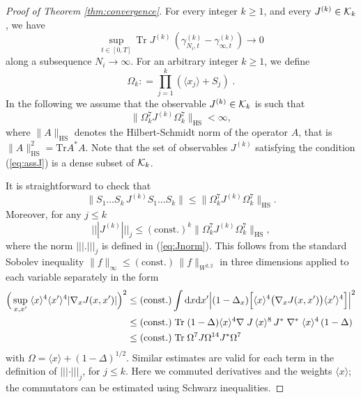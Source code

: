 \documentclass[11pt]{article}
\newcommand{\tri}{| \! | \! |}
\newcommand{\rd}{{\rm d}}
\newcommand{\be}{\begin{equation}}
\newcommand{\ee}{\end{equation}}
\newcommand{\la}{\langle}
\newcommand{\ra}{\rangle}
\newcommand{\tr}{\mbox{Tr}}
\newcommand{\const}{\mathrm{const}}
\newcommand{\cK}{{\cal K}}
\begin{document}
\begin{proof}[Proof of Theorem \ref{thm:convergence}]
For every integer $k
\geq 1$, and every $J^{(k)} \in \cK_k$, we have
\begin{equation}\label{eq:conv-0}
\sup_{t \in [0,T]} \, \tr \; J^{(k)} \, \left( \gamma_{N_i,t}^{(k)} -
 \gamma_{\infty,t}^{(k)} \right) \to 0
\end{equation}
along a subsequence $N_i\to \infty$.
 For an arbitrary integer $k \geq 1$, we define
$$
   \Omega_k : =  \prod_{j=1}^k \left( \la
x_j \ra + S_j \right)   \; .
$$
In the following we assume that the observable $J^{(k)} \in \cK_k$
is such that
\begin{equation}\label{eq:assJ} \Big\| \Omega_k^7
 J^{(k)}\Omega_k^7 \Big\|_{\text{HS}} < \infty ,
\end{equation}
where  $\| A \|_{\text{HS}}$ denotes the Hilbert-Schmidt norm of the
operator $A$, that is $\| A \|^2_{\text{HS}} = \tr A^* A$.
 Note that the set of observables $J^{(k)}$
satisfying the condition (\ref{eq:assJ}) is a dense subset of
$\cK_k$.

It is straightforward to check that
\begin{equation}\label{eq:assJsimple}
\| S_1 \dots S_k \, J^{(k)} S_1 \dots S_k \| \leq \Big\| \Omega_k^7
 J^{(k)}\Omega_k^7 \Big\|_{\text{HS}} .
\end{equation}
Moreover,  for any $j\leq k$ \be \label{HStoj} \tri J^{(k)}\tri_j
\leq (\mbox{const.})^k \Big\| \Omega_k^7 J^{(k)}\Omega_k^7
\Big\|_{\text{HS}} , \ee
where the norm $\tri . \tri_j$ is defined
in (\ref{eq:Jnorm}). This follows from the standard Sobolev
inequality $\| f\|_\infty \leq (\const.) \,  \| f \|_{W^{2,2}}$ in three
dimensions applied to each variable separately in the form
\begin{equation*}
\begin{split}
\Big(\sup_{x,x'} \; \langle x \rangle^4 \langle x'\rangle^4
|\nabla_x J(x,x')|\Big)^2 &\leq (\const.) \int \rd x \rd x' \Big|
  (1-\Delta_x) \Big[\langle x \rangle^4
 \big(\nabla_x J(x,x') \big)\langle x'\rangle^4\Big]\Big|^2
\\ &\leq (\const.) \; \tr \; (1-\Delta)  \langle x \rangle^4 \nabla \; J
 \, \langle x \rangle^8 \, J^* \;  \nabla^*  \;
 \langle x \rangle^4 \, (1-\Delta)
\\& \leq (\const.) \; \tr \; \Omega^7 J\Omega^{14} J^* \Omega^7
\end{split}
\end{equation*}
with $\Omega = \langle x \rangle + (1-\Delta)^{1/2}$. Similar
estimates are valid for each term in the definition of $\tri \cdot
\tri_j$, for $j \leq k$. Here we  commuted derivatives and the
weights $\langle x \rangle$; the commutators can be estimated using
Schwarz inequalities.


\end{proof}
\end{document}

